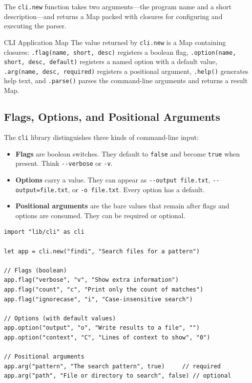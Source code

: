 The \lstinline|cli.new| function takes two arguments---the program name and a short description---and returns a Map packed with closures for configuring and executing the parser.

\begin{defnbox}{CLI Application Map}
The value returned by \lstinline|cli.new| is a Map containing closures:
\lstinline|.flag(name, short, desc)| registers a boolean flag,
\lstinline|.option(name, short, desc, default)| registers a named option with a default value,
\lstinline|.arg(name, desc, required)| registers a positional argument,
\lstinline|.help()| generates help text, and
\lstinline|.parse()| parses the command-line arguments and returns a result Map.
\end{defnbox}

\subsection{Flags, Options, and Positional Arguments}\label{sec:cli-flag-option-arg}


The \lstinline|cli| library distinguishes three kinds of command-line input:

\begin{itemize}
  \item \textbf{Flags} are boolean switches. They default to \lstinline|false| and become \lstinline|true| when present. Think \texttt{-{}-verbose} or \texttt{-v}.
  \item \textbf{Options} carry a value. They can appear as \texttt{-{}-output file.txt}, \texttt{-{}-output=file.txt}, or \texttt{-o file.txt}. Every option has a default.
  \item \textbf{Positional arguments} are the bare values that remain after flags and options are consumed. They can be required or optional.
\end{itemize}

\begin{lstlisting}[language=Lattice, caption={Registering all three kinds of input}]
import "lib/cli" as cli

let app = cli.new("findi", "Search files for a pattern")

// Flags (boolean)
app.flag("verbose", "v", "Show extra information")
app.flag("count", "c", "Print only the count of matches")
app.flag("ignorecase", "i", "Case-insensitive search")

// Options (with default values)
app.option("output", "o", "Write results to a file", "")
app.option("context", "C", "Lines of context to show", "0")

// Positional arguments
app.arg("pattern", "The search pattern", true)     // required
app.arg("path", "File or directory to search", false) // optional
\end{lstlisting}

